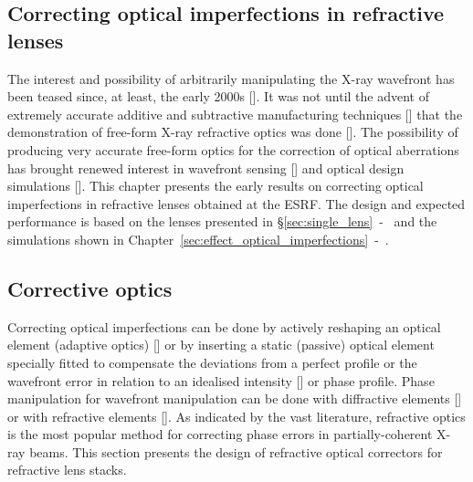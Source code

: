 \begin{refsection}
\chapter{Correcting optical imperfections in refractive lenses}\label{sec:corrections}

The interest and possibility of arbitrarily manipulating the X-ray wavefront has been teased since, at least, the early 2000s [\cite{Chubar1999, Chubar2001b}]. It was not until the advent of extremely accurate additive and subtractive manufacturing techniques [\cite{Stohr2015, Polikarpov2016, Petrov2017, Roth2018, Sanli2018, Seiboth2019, Abrashitova2020, Antipov2020, Lin2020, Medvedskaya2020}] that the demonstration of free-form X-ray refractive optics was done [\cite{Sawhney2016,Seiboth2017,Laundy2019, Seiboth2020, Dhamgaye2020}]. The possibility of producing very accurate free-form optics for the correction of optical aberrations has brought renewed interest in wavefront sensing [\cite{Berujon2015, Seaberg2019}] and optical design simulations [\cite{Laundy2020}]. This chapter presents the early results on correcting optical imperfections in refractive lenses obtained at the ESRF. The design and expected performance is based on the lenses presented in \S\ref{sec:single_lens}~-~\textit{} and the simulations shown in Chapter~\ref{sec:effect_optical_imperfections}~-~\textit{}.

\section{Corrective optics}\label{sec:corrective_optics}

Correcting optical imperfections can be done by actively reshaping an optical element (adaptive optics) [\cite{Sutter2012, Alcock2013}] or by inserting a static (passive) optical element specially fitted to compensate the deviations from a perfect profile or the wavefront error in relation to an idealised intensity [\cite{Donato2020}] or phase profile. Phase manipulation for wavefront manipulation can be done with diffractive elements [\cite{Probst2020}] or with refractive elements [\cite{Sawhney2016,Seiboth2017,Laundy2019,Seiboth2020, Dhamgaye2020}]. As indicated by the vast literature, refractive optics is the most popular method for correcting phase errors in partially-coherent X-ray beams. This section presents the design of refractive optical correctors for refractive lens stacks.


\end{refsection}
